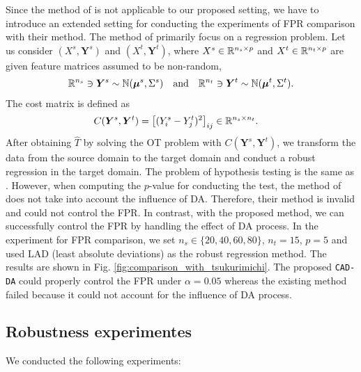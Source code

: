 Since the method of \cite{tsukurimichi2022conditional} is not applicable to our proposed setting, we have to introduce an extended setting for conducting the experiments of FPR comparison with their method.
%
The method of \cite{tsukurimichi2022conditional} primarily focus on a regression problem.
%
Let us consider $(X^s, \bm Y^s)$ and $(X^t, \bm Y^t)$, where $X^s \in \mathbb{R}^{n_s \times p}$ and $X^t \in \mathbb{R}^{n_t \times p}$ are given feature matrices assumed to be non-random,
\begin{align*}
	\mathbb{R}^{n_s} \ni \bm Y^s \sim \mathbb{N} (\bm \mu^s, \Sigma^s) \quad \text{and} \quad \mathbb{R}^{n_t} \ni \bm Y^t \sim \mathbb{N} (\bm \mu^t, \Sigma^t).
\end{align*}
%
The cost matrix is defined as 
%
\begin{align*} %
	C(\bm Y^s, \bm Y^t) 
	& = \big[(Y_i^s - Y_j^t)^2 \big]_{ij} \in \RR^{n_s \times n_t}.
\end{align*}
%
After obtaining $\hat{T}$ by solving the OT problem with $C( \bm Y^s, \bm Y^t)$, we transform the data from the source domain to the target domain and conduct a robust regression in the target domain.
%
The problem of hypothesis testing is the same as \cite{tsukurimichi2022conditional}.
%
However, when computing the $p$-value for conducting the test, the method of \cite{tsukurimichi2022conditional} does not take into account the influence of DA. 
%
Therefore, their method is invalid and could not control the FPR.
%
In contrast, with the proposed method, we can successfully control the FPR by handling the effect of DA process.
%
In the experiment for FPR comparison, we set $n_s \in \{20, 40, 60, 80\}$, $n_t = 15$, $p = 5$ and used  LAD (least absolute deviations) as the robust regression method.
%
The results are shown in Fig. \ref{fig:comparison_with_tsukurimichi}.
%
The proposed {\tt CAD-DA} could properly control the FPR under $\alpha = 0.05$ whereas the existing method \cite{tsukurimichi2022conditional} failed because it could not account for the influence of DA process.




\subsection{Robustness experimentes} \label{appx:robustness}

We conducted the following experiments:

